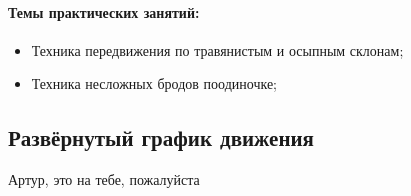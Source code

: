 \paragraph{Темы практических занятий:}

\begin{itemize}
	\item Техника передвижения по травянистым и осыпным склонам;
	\item Техника несложных бродов поодиночке;
\end{itemize}

\newpage
\subsection{Развёрнутый график движения}
\alert{Артур, это на тебе, пожалуйста}
\begin{table}[h!]
	\centering
\end{table}
